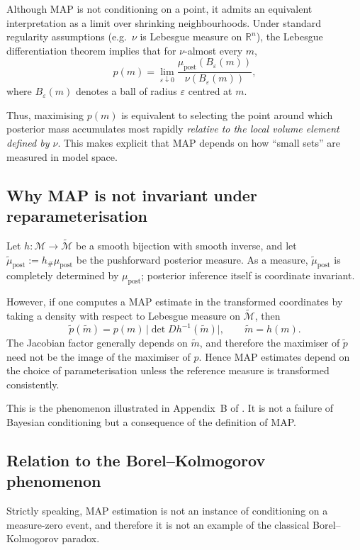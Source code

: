 \documentclass[11pt]{article}
\theoremstyle{remark}
\newcommand{\modelspace}{\mathcal{M}}
\begin{document}
Although MAP is not conditioning on a point, it admits an equivalent
interpretation as a limit over shrinking neighbourhoods. Under standard
regularity assumptions (e.g.\ \(\nu\) is Lebesgue measure on \(\mathbb R^n\)),
the Lebesgue differentiation theorem implies that for \(\nu\)-almost every
\(m\),
\[
p(m)
=
\lim_{\varepsilon\downarrow 0}
\frac{\mu_{\text{post}}(B_\varepsilon(m))}{\nu(B_\varepsilon(m))},
\]
where \(B_\varepsilon(m)\) denotes a ball of radius \(\varepsilon\) centred at
\(m\).

Thus, maximising \(p(m)\) is equivalent to selecting the point around which
posterior mass accumulates most rapidly \emph{relative to the local volume
element defined by \(\nu\)}. This makes explicit that MAP depends on how
``small sets'' are measured in model space.

\subsection{Why MAP is not invariant under reparameterisation}

Let \(h:\modelspace\to\tilde{\modelspace}\) be a smooth bijection with smooth
inverse, and let \(\tilde\mu_{\text{post}}:=h_{\#}\mu_{\text{post}}\) be the
pushforward posterior measure. As a measure, \(\tilde\mu_{\text{post}}\) is
completely determined by \(\mu_{\text{post}}\); posterior inference itself is
coordinate invariant.

However, if one computes a MAP estimate in the transformed coordinates by
taking a density with respect to Lebesgue measure on \(\tilde{\modelspace}\),
then
\[
\tilde p(\tilde m)
=
p(m)\,\bigl|\det Dh^{-1}(\tilde m)\bigr|,
\qquad \tilde m=h(m).
\]
The Jacobian factor generally depends on \(\tilde m\), and therefore the
maximiser of \(\tilde p\) need not be the image of the maximiser of \(p\).
Hence MAP estimates depend on the choice of parameterisation unless the
reference measure is transformed consistently.

This is the phenomenon illustrated in Appendix~B of
\citet{MosegaardCurtis2024}. It is not a failure of Bayesian conditioning but a
consequence of the definition of MAP.

\subsection{Relation to the Borel--Kolmogorov phenomenon}

Strictly speaking, MAP estimation is not an instance of conditioning on a
measure-zero event, and therefore it is not an example of the classical
Borel--Kolmogorov paradox.
\end{document}
